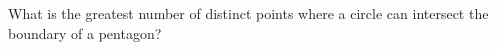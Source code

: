 What is the greatest number of distinct points where a circle can intersect the boundary of a pentagon?

